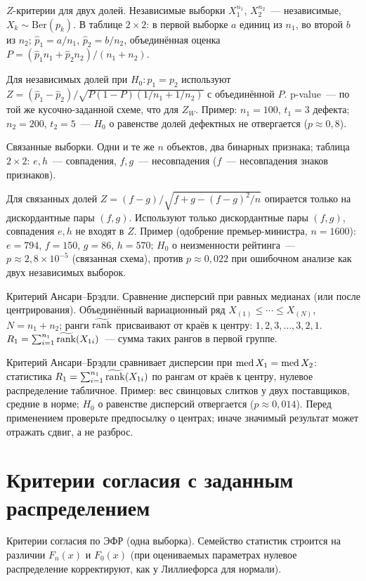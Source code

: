 $Z$-критерии для двух долей. Независимые выборки $X_1^{n_1}$, $X_2^{n_2}$~--- независимые, $X_k\sim\mathrm{Ber}(p_k)$.
В таблице $2\times 2$: в первой выборке $a$ единиц из $n_1$, во второй $b$ из $n_2$; $\hat p_1=a/n_1$, $\hat p_2=b/n_2$, объединённая оценка $P=(\hat p_1 n_1+\hat p_2 n_2)/(n_1+n_2)$.

Для независимых долей при $H_0\colon p_1=p_2$ используют $Z=(\hat p_1-\hat p_2)/\sqrt{P(1-P)(1/n_1+1/n_2)}$ с объединённой $P$.
p-value~--- по той же кусочно-заданной схеме, что для $Z_W$.
Пример: $n_1=100$, $t_1=3$ дефекта; $n_2=200$, $t_2=5$~--- $H_0$ о равенстве долей дефектных не отвергается ($p\approx 0{,}8$).

Связанные выборки. Одни и те же $n$ объектов, два бинарных признака; таблица $2\times 2$: $e,h$~--- совпадения, $f,g$~--- несовпадения ($f$~--- несовпадения знаков признаков).

Для связанных долей $Z=(f-g)/\sqrt{f+g-(f-g)^2/n}$ опирается только на дискордантные пары $(f,g)$.
Используют только дискордантные пары $(f,g)$, совпадения $e,h$ не входят в $Z$.
Пример (одобрение премьер-министра, $n=1600$): $e=794$, $f=150$, $g=86$, $h=570$; $H_0$ о неизменности рейтинга~--- $p\approx 2{,}8\times 10^{-5}$ (связанная схема), против $p\approx 0{,}022$ при ошибочном анализе как двух независимых выборок.

Критерий Ансари--Брэдли. Сравнение дисперсий при равных медианах (или после центрирования).
Объединённый вариационный ряд $X_{(1)}\le\cdots\le X_{(N)}$, $N=n_1+n_2$; ранги $\widetilde{\operatorname{rank}}$ присваивают от краёв к центру: $1,2,3,\ldots,3,2,1$.
$R_1=\sum_{i=1}^{n_1}\widetilde{\operatorname{rank}}(X_{1i})$~--- сумма таких рангов в первой группе.

Критерий Ансари--Брэдли сравнивает дисперсии при $\operatorname{med} X_1=\operatorname{med} X_2$: статистика $R_1=\sum_{i=1}^{n_1}\widetilde{\operatorname{rank}}(X_{1i})$ по рангам от краёв к центру, нулевое распределение табличное.
Пример: вес свинцовых слитков у двух поставщиков, средние в норме; $H_0$ о равенстве дисперсий отвергается ($p\approx 0{,}014$).
 Перед применением проверьте предпосылку о центрах; иначе значимый результат может отражать сдвиг, а не разброс.

\section{Критерии согласия с заданным распределением}
\label{sec:gof-ch2}

Критерии согласия по ЭФР (одна выборка). Семейство статистик строится на различии $F_n(x)$ и $F_0(x)$ (при оцениваемых параметрах нулевое распределение корректируют, как у Лиллиефорса для нормали).

